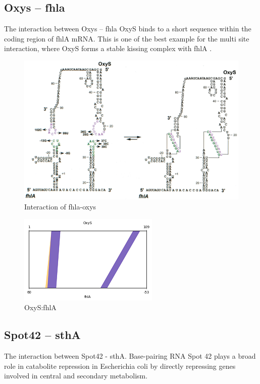 \documentclass[twoside,a4paper]{report}
\begin{document}
\clearpage		
	\subsection{Oxys – fhla}
	
	The interaction between Oxys – fhla OxyS binds to a short sequence within the coding region of fhlA mRNA. This is one of the best example for the multi site interaction, where OxyS forms a stable kissing complex with fhlA . \\


	\begin{figure}[h!tb]
	\includegraphics[width=1.0\linewidth]{oxys}
	\centering
	\caption{ Interaction of fhla-oxys } 
	\label{fig:oxys}
	\end{figure}

\begin{figure}[h!tb]
	\centering
	\includegraphics[width=.4\linewidth]{fhla}
	\caption{OxyS:fhlA}
	\label{fig:fhla}
\end{figure}

\clearpage
	
	
	
	\subsection{Spot42 – sthA }
	
	The interaction between Spot42 - sthA. Base-pairing RNA Spot 42 plays a broad role in catabolite repression in Escherichia coli by directly repressing genes involved in central and secondary metabolism.\\
	
\end{document}
